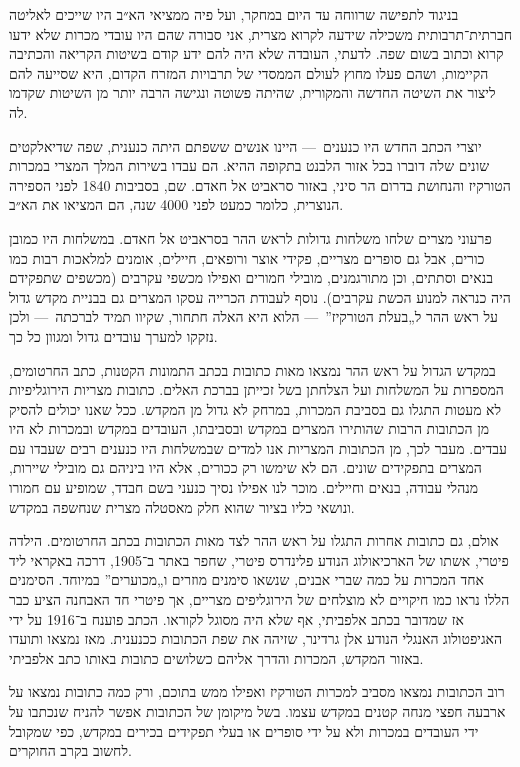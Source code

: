 בניגוד לתפישה שרווחה עד היום במחקר, ועל פיה ממציאי הא״ב היו שייכים לאליטה חברתית־תרבותית משכילה שידעה לקרוא מצרית, אני סבורה שהם היו עובדי מכרות שלא ידעו קרוא וכתוב בשום שפה. לדעתי, העובדה שלא היה להם ידע קודם בשיטות הקריאה והכתיבה הקיימות, ושהם פעלו מחוץ לעולם הממסדי של תרבויות המזרח הקדום, היא שסייעה להם ליצור את השיטה החדשה והמקורית, שהיתה פשוטה ונגישה הרבה יותר מן השיטות שקדמו לה.

יוצרי הכתב החדש היו כנענים~— היינו אנשים ששפתם היתה כנענית, שפה שדיאלקטים שונים שלה דוברו בכל אזור הלבנט בתקופה ההיא. הם עבדו בשירות המלך המצרי במכרות הטורקיז והנחושת בדרום הר סיני, באזור סראביט אל חאדם. שם, בסביבות 1840 לפני הספירה הנוצרית, כלומר כמעט לפני 4000 שנה, הם המציאו את הא״ב.

פרעוני מצרים שלחו משלחות גדולות לראש ההר בסראביט אל חאדם. במשלחות היו כמובן כורים, אבל גם סופרים מצריים, פקידי אוצר ורופאים, חיילים, אומנים למלאכות רבות כמו בנאים וסתתים, וכן מתורגמנים, מובילי חמורים ואפילו מכשפי עקרבים (מכשפים שתפקידם היה כנראה למנוע הכשת עקרבים). נוסף לעבודת הכרייה עסקו המצרים גם בבניית מקדש גדול על ראש ההר ל„בעלת הטורקיז”~— הלוא היא האלה חתחור, שקיוו תמיד לברכתה~— ולכן נזקקו למערך עובדים גדול ומגוון כל כך.

במקדש הגדול על ראש ההר נמצאו מאות כתובות בכתב התמונות הקטנות, כתב החרטומים, המספרות על המשלחות ועל הצלחתן בשל זכייתן בברכת האלים. כתובות מצריות הירוגליפיות לא מעטות התגלו גם בסביבת המכרות, במרחק לא גדול מן המקדש. ככל שאנו יכולים להסיק מן הכתובות הרבות שהותירו המצרים במקדש ובסביבתו, העובדים במקדש ובמכרות לא היו עבדים. מעבר לכך, מן הכתובות המצריות אנו למדים שבמשלחות היו כנענים רבים שעבדו עם המצרים בתפקידים שונים. הם לא שימשו רק ככורים, אלא היו ביניהם גם מובילי שיירות, מנהלי עבודה, בנאים וחיילים. מוכר לנו אפילו נסיך כנעני בשם חבדד, שמופיע עם חמורו ונושאי כליו בציור שהוא חלק מאסטלה מצרית שנחשפה במקדש.

אולם, גם כתובות אחרות התגלו על ראש ההר לצד מאות הכתובות בכתב החרטומים. הילדה פיטרי, אשתו של הארכיאולוג הנודע פלינדרס פיטרי, שחפר באתר ב־1905, דרכה באקראי ליד אחד המכרות על כמה שברי אבנים, שנשאו סימנים מוזרים ו„מכוערים” במיוחד. הסימנים הללו נראו כמו חיקויים לא מוצלחים של הירוגליפים מצריים, אך פיטרי חד האבחנה הציע כבר אז שמדובר בכתב אלפביתי, אף שלא היה מסוגל לקוראו. הכתב פוענח ב־1916 על ידי האגיפטולוג האנגלי הנודע אלן גרדינר, שזיהה את שפת הכתובות ככנענית. מאז נמצאו ותועדו באזור המקדש, המכרות והדרך אליהם כשלושים כתובות באותו כתב אלפביתי.

רוב הכתובות נמצאו מסביב למכרות הטורקיז ואפילו ממש בתוכם, ורק כמה כתובות נמצאו על ארבעה חפצי מנחה קטנים במקדש עצמו. בשל מיקומן של הכתובות אפשר להניח שנכתבו על ידי העובדים במכרות ולא על ידי סופרים או בעלי תפקידים בכירים במקדש, כפי שמקובל לחשוב בקרב החוקרים.

